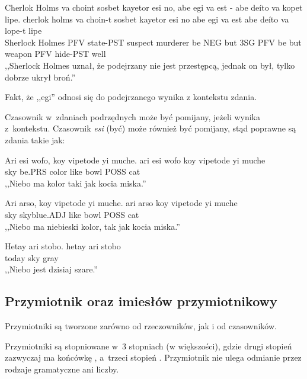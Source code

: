 \begin{spacing}{1.1}
\begin{exe}
	\ex
	\trans Cherlok Holms va choint sosbet kayetor esi no, abe egi va est - abe deíto va kopet lipe.
	\gll cherlok holms va choin-t sosbet kayetor esi no abe egi va est abe deíto va lope-t lipe\\
	  Sherlock Holmes PFV state-PST suspect murderer be NEG but 3SG PFV be but weapon PFV hide-PST well\\
	\glt  ,,Sherlock Holmes uznał, że podejrzany nie jest przestępcą, jednak on był, tylko dobrze ukrył broń.''
\end{exe}

Fakt, że ,,egi'' odnosi się do podejrzanego wynika z kontekstu zdania.

Czasownik w~zdaniach podrzędnych może być pomijany, jeżeli wynika z~kontekstu.
Czasownik \emph{esi} (być) może również być pomijany, stąd poprawne są zdania
takie jak:

\begin{exe}
	\ex
	\trans Ari esi wofo, koy vipetode yi muche.
	\gll ari esi wofo koy vipetode yi muche\\
	  sky be.PRS color like bowl POSS cat\\
	\glt  ,,Niebo ma kolor taki jak kocia miska.''
\end{exe}

\begin{exe}
	\ex
	\trans Ari arso, koy vipetode yi muche.
	\gll ari arso koy vipetode yi muche\\
	  sky skyblue.ADJ like bowl POSS cat\\
	\glt  ,,Niebo ma niebieski kolor, tak jak kocia miska.''
\end{exe}

\begin{exe}
	\ex
	\trans Hetay ari stobo.
	\gll hetay ari stobo\\
	  today sky gray\\
	\glt  ,,Niebo jest dzisiaj szare.''
\end{exe}

\subsection{Przymiotnik oraz imiesłów przymiotnikowy}

Przymiotniki są tworzone zarówno od rzeczowników, jak i od czasowników.

Przymiotniki są stopniowane w~3 stopniach (w większości), gdzie drugi stopień
zazwyczaj ma końcówkę , a~trzeci stopień . Przymiotnik nie
ulega odmianie przez rodzaje gramatyczne ani liczby.


\end{spacing}
